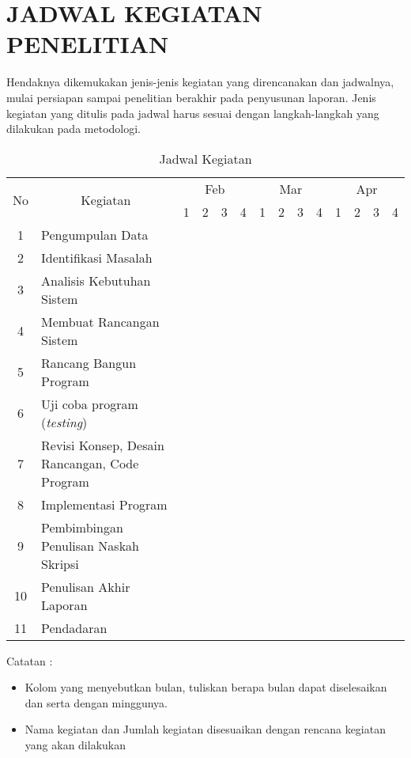 \chapter*{JADWAL KEGIATAN PENELITIAN}
Hendaknya   dikemukakan   jenis-jenis   kegiatan   yang   direncanakan   dan    jadwalnya, mulai persiapan sampai penelitian berakhir pada penyusunan laporan. Jenis
kegiatan yang ditulis pada jadwal harus sesuai dengan langkah-langkah yang dilakukan pada metodologi.


\begin{table}[!ht]
\caption{Jadwal Kegiatan}
\label{tab:jadwal-kegiatan}
\begin{tabular}{|c|m{5cm}|p{.2cm}|p{.2cm}|p{.2cm}|p{.2cm}|p{.2cm}|p{.2cm}|p{.2cm}|p{.2cm}|p{.2cm}|p{.2cm}|p{.2cm}|p{.2cm}|}
\hline
\multirow{2}{*}{No}	& 
\multicolumn{1}{c|}{\multirow{2}{*}{Kegiatan}}	& 
\multicolumn{4}{c|}{Feb} & 
\multicolumn{4}{c|}{Mar} &
\multicolumn{4}{c|}{Apr} \\ \cline{3-14}
& & 
\multicolumn{1}{c|}{1} &
\multicolumn{1}{c|}{2} &
\multicolumn{1}{c|}{3} &
\multicolumn{1}{c|}{4} &
\multicolumn{1}{c|}{1} &
\multicolumn{1}{c|}{2} &
\multicolumn{1}{c|}{3} &
\multicolumn{1}{c|}{4} &
\multicolumn{1}{c|}{1} &
\multicolumn{1}{c|}{2} &
\multicolumn{1}{c|}{3} &
\multicolumn{1}{c|}{4} \\ \hline
1  & Pengumpulan Data 			& \cellcolor{gray!75} & \cellcolor{gray!75} & & & & & & & & & & \\ \hline
2  & Identifikasi Masalah 		& & & \cellcolor{gray!75} & & & & & & & & & \\ \hline
3  & Analisis Kebutuhan Sistem 	& & \cellcolor{gray!75} & \cellcolor{gray!75} & \cellcolor{gray!75} & & & & & & & & \\ \hline
4  & Membuat Rancangan Sistem 	& & & & \cellcolor{gray!75} & \cellcolor{gray!75} & & & & & & & \\ \hline
5  & Rancang Bangun Program 	& & & & & & \cellcolor{gray!75} & \cellcolor{gray!75} & \cellcolor{gray!75} & & & & \\ \hline
6  & Uji coba program (\textit{testing}) 			& & & & & & & & \cellcolor{gray!75} & \cellcolor{gray!75} & & & \\ \hline
7  & Revisi Konsep, Desain Rancangan, Code Program & & & & & & & & & \cellcolor{gray!75} & \cellcolor{gray!75} & & \\ \hline
8  & Implementasi Program 					& & & & & & & & & & & \cellcolor{gray!75} & \\ \hline
9  & Pembimbingan Penulisan Naskah Skripsi & & & & & \cellcolor{gray!75} & \cellcolor{gray!75} & \cellcolor{gray!75} & \cellcolor{gray!75} & \cellcolor{gray!75} & & & \\ \hline
10 & Penulisan Akhir Laporan 				& & & & & & & & & & \cellcolor{gray!75} & & \\ \hline
11 & Pendadaran 							& & & & & & & & & & & & \cellcolor{gray!75} \\ \hline
\end{tabular}
\end{table}



Catatan : 
\begin{itemize}
\item Kolom yang menyebutkan bulan, tuliskan berapa bulan dapat diselesaikan dan serta dengan minggunya.
\item Nama kegiatan dan Jumlah kegiatan disesuaikan dengan rencana kegiatan yang akan dilakukan
\end{itemize}